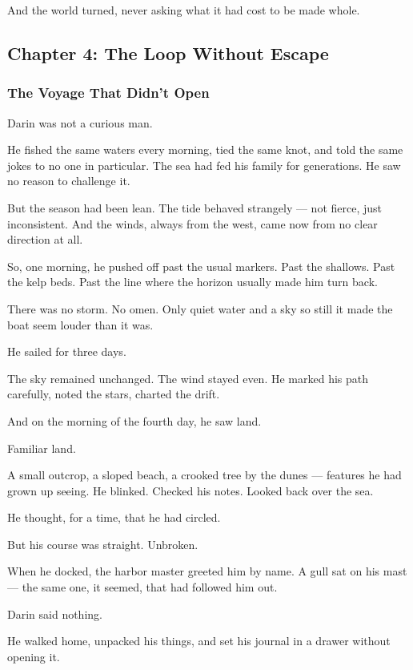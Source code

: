 \documentclass[12pt]{article}
\begin{document}
And the world turned, never asking what it had cost to be made whole.

\newpage

\subsection*{Chapter 4: The Loop Without Escape}

\vspace{.5in}

\subsubsection*{The Voyage That Didn’t Open}

Darin was not a curious man.

He fished the same waters every morning, tied the same knot, and told the same jokes to no one in particular. The sea had fed his family for generations. He saw no reason to challenge it.

But the season had been lean. The tide behaved strangely — not fierce, just inconsistent. And the winds, always from the west, came now from no clear direction at all.

So, one morning, he pushed off past the usual markers. Past the shallows. Past the kelp beds. Past the line where the horizon usually made him turn back.

There was no storm. No omen. Only quiet water and a sky so still it made the boat seem louder than it was.

He sailed for three days.

The sky remained unchanged. The wind stayed even. He marked his path carefully, noted the stars, charted the drift.

And on the morning of the fourth day, he saw land.

Familiar land.

A small outcrop, a sloped beach, a crooked tree by the dunes — features he had grown up seeing. He blinked. Checked his notes. Looked back over the sea.

He thought, for a time, that he had circled.

But his course was straight. Unbroken.

When he docked, the harbor master greeted him by name. A gull sat on his mast — the same one, it seemed, that had followed him out.

Darin said nothing.

He walked home, unpacked his things, and set his journal in a drawer without opening it.
\end{document}
